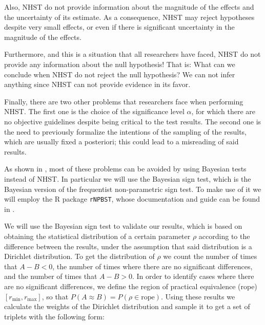 Also, \acs{NHST} do not provide information about the magnitude of the effects and the uncertainty of its estimate. As a consequence, \acs{NHST} may reject hypotheses despite very small effects, or even if there is significant uncertainty in the magnitude of the effects.

Furthermore, and this is a situation that all researchers have faced, \acs{NHST} do not provide any information about the null hypothesis! That is: What can we conclude when \acs{NHST} do not reject the null hypothesis? We can not infer anything since \acs{NHST} can not provide evidence in its favor.

Finally, there are two other problems that researchers face when performing \acs{NHST}. The first one is the choice of the significance level $\alpha$, for which there are no objective guidelines despite being critical to the test results. The second one is the need to previously formalize the intentions of the sampling of the results, which are usually fixed a posteriori; this could lead to a misreading of said results.

As shown in \cite{benavoli2017time}, most of these problems can be avoided by using Bayesian tests instead of \acs{NHST}. In particular we will use the Bayesian sign test, which is the Bayesian version of the frequentist non-parametric sign test. To make use of it we will employ the R package \texttt{rNPBST}, whose documentation and guide can be found in \cite{carrasco2017rnpbst}.

We will use the Bayesian sign test to validate our results, which is based on obtaining the statistical distribution of a certain parameter $\rho$ according to the difference between the results, under the assumption that said distribution is a Dirichlet distribution. To get the distribution of $\rho$ we count the number of times that $A - B < 0$, the number of times where there are no significant differences, and the number of times that $A - B > 0$. In order to identify cases where there are no significant differences, we define the region of practical equivalence (rope) $[r_\text{min}, r_\text{max}]$, so that $P(A \approx B) = P(\rho \in \text{rope})$. Using these results we calculate the weights of the Dirichlet distribution and sample it to get a set of triplets with the following form: \\

\noindent\resizebox{\textwidth}{!}{$[P(\rho < r_\text{min}) = P(A - B < 0),\;\; P(\rho \in \text{rope}),\;\; P(\rho > r_\text{max}) = P(A - B > 0)]$}

